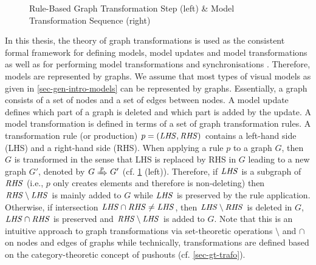 \begin{figure}[!tb]
\begin{center}
\end{center}
\caption{Rule-Based Graph Transformation Step (left) \& Model Transformation Sequence (right)}
\label{fig:sec-gen-intro-gratrafos:trafos}
\end{figure}

In this thesis, the theory of graph transformations is used as the consistent formal framework for defining models, model updates and model transformations as well as for performing model transformations and synchronisations \cite{Ehrig:2006:FAG:1121741,FAGT2}.
Therefore, models are represented by graphs.
We assume that most types of visual models as given in \cref{sec-gen-intro-models} can be represented by graphs.
Essentially, a graph consists of a set of nodes and a set of edges between nodes.
A model update defines which part of a graph is deleted and which part is added by the update.
A model transformation is defined in terms of a set of graph transformation rules.
A transformation rule (or production) $p=(\mathit{LHS},\mathit{RHS})$ contains a left-hand side (LHS) and a right-hand side (RHS).
When applying a rule $p$ to a graph $G$, then $G$ is transformed in the sense that LHS is replaced by RHS in $G$ leading to a new graph $G'$, denoted by $G \Trans{p} G'$ (cf. \cref{fig:sec-gen-intro-gratrafos:trafos} (left)).
Therefore, if $\mathit{LHS}$ is a subgraph of $\mathit{RHS}$ (i.e., $p$ only creates elements and therefore is non-deleting) then $\mathit{RHS} \setminus \mathit{LHS}$ is mainly added to $G$ while $\mathit{LHS}$ is preserved by the rule application.
Otherwise, if intersection $\mathit{LHS} \cap \mathit{RHS} \neq \mathit{LHS}$, then $\mathit{LHS} \setminus \mathit{RHS}$ is deleted in $G$, $\mathit{LHS} \cap \mathit{RHS}$ is preserved and $\mathit{RHS} \setminus \mathit{LHS}$ is added to $G$.
Note that this is an intuitive approach to graph transformations via set-theoretic operations $\setminus$ and $\cap$ on nodes and edges of graphs while technically, transformations are defined based on the category-theoretic concept of pushouts (cf. \cref{sec-gt-trafo}).

